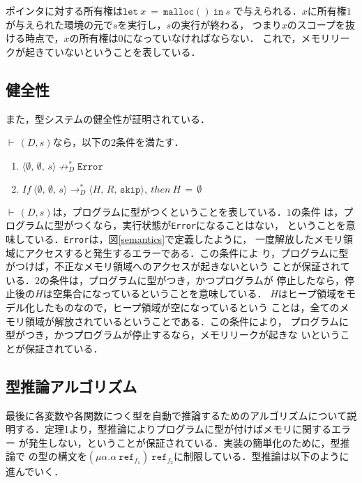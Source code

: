 ポインタに対する所有権は$\texttt{let}\ x\ =\ \texttt{malloc}()\ \texttt{in}\ s$
で与えられる．$x$に所有権$1$が与えられた環境の元で$s$を実行し，$s$の実行が終わる，
つまり$x$のスコープを抜ける時点で，$x$の所有権は$0$になっていなければならない．
これで，メモリリークが起きていないということを表している．

\subsection{健全性}
また，型システムの健全性が証明されている．

\begin{theorem}
  $\vdash\,(D,s)$なら，以下の2条件を満たす．
    \begin{enumerate}
      \item $\langle \emptyset,\,\emptyset,\,s \rangle
            \not\longrightarrow^{*}_{D} \texttt{Error}$
      \item $\mathit{If}\ \langle \emptyset,\,\emptyset,\,s \rangle
            \longrightarrow^{*}_{D} \langle H,\,R,\,\texttt{skip} \rangle,
            \ then\ H\,=\,\emptyset$
    \end{enumerate}
\end{theorem}

$\vdash\,(D,s)$は，プログラムに型がつくということを表している．$1$の条件
は，プログラムに型がつくなら，実行状態が\texttt{Error}になることはない，
ということを意味している．\texttt{Error}は，図\ref{semantics}で定義したように，
一度解放したメモリ領域にアクセスすると発生するエラーである．この条件によ
り，プログラムに型がつけば，不正なメモリ領域へのアクセスが起きないという
ことが保証されている．$2$の条件は，プログラムに型がつき，かつプログラムが
停止したなら，停止後の$H$は空集合になっているということを意味している．
$H$はヒープ領域をモデル化したものなので，ヒープ領域が空になっているという
ことは，全てのメモリ領域が解放されているということである．この条件により，
プログラムに型がつき，かつプログラムが停止するなら，メモリリークが起きな
いということが保証されている．


\subsection{型推論アルゴリズム}
最後に各変数や各関数につく型を自動で推論するためのアルゴリズムについて説
明する．定理1より，型推論によりプログラムに型が付けばメモリに関するエラー
が発生しない，ということが保証されている．実装の簡単化のために，型推論で
の型の構文を$(\mu\alpha.\alpha\ \texttt{ref}_{f_{1}})\
\texttt{ref}_{f_{2}}$に制限している．型推論は以下のように進んでいく．

